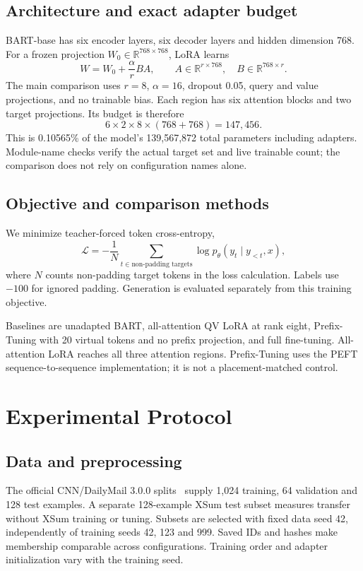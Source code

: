 \documentclass[11pt,letterpaper]{article}
\begin{document}
\subsection{Architecture and exact adapter budget}
BART-base has six encoder layers, six decoder layers and hidden dimension 768. For a frozen projection $W_0\in\mathbb{R}^{768\times768}$, LoRA learns
\[
W=W_0+\frac{\alpha}{r}BA,\qquad
A\in\mathbb{R}^{r\times768},\quad B\in\mathbb{R}^{768\times r}.
\]
The main comparison uses $r=8$, $\alpha=16$, dropout 0.05, query and value projections, and no trainable bias. Each region has six attention blocks and two target projections. Its budget is therefore
\[
6\times2\times8\times(768+768)=147{,}456.
\]
This is 0.10565\% of the model's 139,567,872 total parameters including adapters. Module-name checks verify the actual target set and live trainable count; the comparison does not rely on configuration names alone.
\subsection{Objective and comparison methods}
We minimize teacher-forced token cross-entropy,
\[
\mathcal{L}=-\frac{1}{N}\sum_{t\in\text{non-padding targets}}
\log p_\theta(y_t\mid y_{<t},x),
\]
where $N$ counts non-padding target tokens in the loss calculation. Labels use $-100$ for ignored padding. Generation is evaluated separately from this training objective.

Baselines are unadapted BART, all-attention QV LoRA at rank eight, Prefix-Tuning with 20 virtual tokens and no prefix projection, and full fine-tuning. All-attention LoRA reaches all three attention regions. Prefix-Tuning uses the PEFT sequence-to-sequence implementation; it is not a placement-matched control.

\section{Experimental Protocol}
\subsection{Data and preprocessing}
The official CNN/DailyMail 3.0.0 splits~\cite{data} supply 1,024 training, 64 validation and 128 test examples. A separate 128-example XSum test subset measures transfer without XSum training or tuning. Subsets are selected with fixed data seed 42, independently of training seeds 42, 123 and 999. Saved IDs and hashes make membership comparable across configurations. Training order and adapter initialization vary with the training seed.
\end{document}
